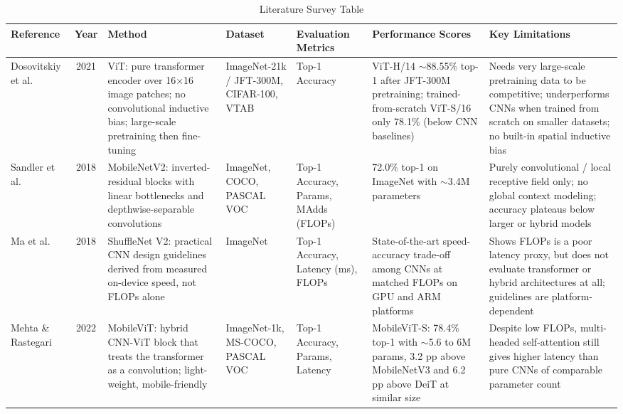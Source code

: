 \documentclass[conference]{IEEEtran}
\begin{document}
\begin{table}[!p]
\caption{Literature Survey Table}
\label{tab:survey}
\centering
\scriptsize
\renewcommand{\arraystretch}{1.05}
\setlength{\tabcolsep}{2.5pt}
\begin{tabular}{|P{0.087\textwidth}|c|P{0.189\textwidth}|P{0.133\textwidth}|P{0.097\textwidth}|P{0.174\textwidth}|P{0.199\textwidth}|}
\hline
\textbf{Reference} & \textbf{Year} & \textbf{Method} & \textbf{Dataset} & \textbf{Evaluation Metrics} & \textbf{Performance Scores} & \textbf{Key Limitations} \\
\hline
Dosovitskiy et al.~\cite{dosovitskiy2021vit} & 2021 & ViT: pure transformer encoder over 16$\times$16 image patches; no convolutional inductive bias; large-scale pretraining then fine-tuning & ImageNet-21k / JFT-300M, CIFAR-100, VTAB & Top-1 Accuracy & ViT-H/14 $\sim$88.55\% top-1 after JFT-300M pretraining; trained-from-scratch ViT-S/16 only 78.1\% (below CNN baselines) & Needs very large-scale pretraining data to be competitive; underperforms CNNs when trained from scratch on smaller datasets; no built-in spatial inductive bias \\
\hline
Sandler et al.~\cite{sandler2018mobilenetv2} & 2018 & MobileNetV2: inverted-residual blocks with linear bottlenecks and depthwise-separable convolutions & ImageNet, COCO, PASCAL VOC & Top-1 Accuracy, Params, MAdds (FLOPs) & 72.0\% top-1 on ImageNet with $\sim$3.4M parameters & Purely convolutional / local receptive field only; no global context modeling; accuracy plateaus below larger or hybrid models \\
\hline
Ma et al.~\cite{ma2018shufflenetv2} & 2018 & ShuffleNet V2: practical CNN design guidelines derived from measured on-device speed, not FLOPs alone & ImageNet & Top-1 Accuracy, Latency (ms), FLOPs & State-of-the-art speed-accuracy trade-off among CNNs at matched FLOPs on GPU and ARM platforms & Shows FLOPs is a poor latency proxy, but does not evaluate transformer or hybrid architectures at all; guidelines are platform-dependent \\
\hline
Mehta \& Rastegari~\cite{mehta2022mobilevit} & 2022 & MobileViT: hybrid CNN-ViT block that treats the transformer as a convolution; light-weight, mobile-friendly & ImageNet-1k, MS-COCO, PASCAL VOC & Top-1 Accuracy, Params, Latency & MobileViT-S: 78.4\% top-1 with $\sim$5.6 to 6M params, 3.2 pp above MobileNetV3 and 6.2 pp above DeiT at similar size & Despite low FLOPs, multi-headed self-attention still gives higher latency than pure CNNs of comparable parameter count \\

\end{tabular}
\end{table}
\end{document}
